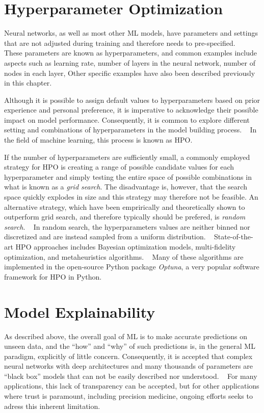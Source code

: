 \section{Hyperparameter Optimization}

Neural networks, as well as most other \ac{ML} models,
have parameters and settings that are not adjusted 
during training and therefore needs to pre-specified.
~\autocite{goodfellow2016deep}
These parameters are known as hyperparameters, 
and common examples include aspects such as 
learning rate,
number of layers in the neural network,
number of nodes in each layer,
Other specific examples have also been described previously in this chapter.

Although it is possible to assign default values to hyperparameters 
based on prior experience and personal preference, 
it is imperative to acknowledge their possible impact on model performance.
Consequently, it is common to explore different setting and combinations
of hyperparameters in the model building process.
~\autocite{goodfellow2016deep}
In the field of machine learning, this process is known as \ac{HPO}.

If the number of hyperparameters are sufficiently small,
a commonly employed strategy for \ac{HPO} 
is creating a range of possible candidate values 
for each hyperparameter and 
simply testing the entire space of 
possible combinations in what is known as a \emph{grid search}.
The disadvantage is, however, that the search space quickly 
explodes in size and this strategy may therefore not be feasible.
An alternative strategy, 
which have been emprirically and theoretically shown to outperform
grid search, and therefore typically should be prefered,  
is \emph{random search}.
~\autocite{bergstraRandom2012}
In random search, the hyperparameters values are neither binned nor
discretized and are instead sampled from a uniform distribution.
~\autocite{bergstraRandom2012}
State-of-the-art \ac{HPO} approaches includes Bayesian optimization 
models, multi-fidelity optimization, and metaheuristics algorithms.
~\autocite{yangHyperparameter2020}
Many of these algorithms are implemented in the 
open-source Python package \textit{Optuna},
a very popular software framework for \ac{HPO} in Python.
~\autocite{akibaOptuna2019}

\section{Model Explainability}

As described above, the overall goal of \ac{ML} 
is to make accurate predictions on unseen data,
and the \enquote{how} and \enquote{why} of such predictions is,
in the general \ac{ML} paradigm, 
explicitly of little concern.
Consequently, it is accepted that complex neural networks
with deep architectures and many thousands of parameters 
are \enquote{black box} models that can not 
be easily described nor understood.
~\autocite{russellArtificial2009}
For many applications, 
this lack of transparency can be accepted,
but for other applications where trust is paramount, 
including precision medicine,
ongoing efforts seeks to adress this inherent limitation.
~\autocite{vanderveldenExplainable2022}

